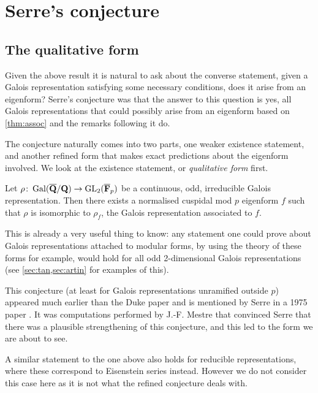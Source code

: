 \documentclass[a4paper,12pt]{article}
\begin{document}
\section{Serre's conjecture}
\subsection{The qualitative form}
Given the above result it is natural to ask about the converse statement, given a Galois representation satisfying some necessary conditions, does it arise from an eigenform?
Serre's conjecture was that the answer to this question is yes, all Galois representations that could possibly arise from an eigenform based on \cref{thm:assoc} and the remarks following it do.

The conjecture naturally comes into two parts, one weaker existence statement, and another refined form that makes exact predictions about the eigenform involved.
We look at the existence statement, or \emph{qualitative form} first.

\begin{conjecture}\label{conj:qual}
Let $\rho\colon \operatorname{Gal}(\overline{\mathbf{Q}}/\mathbf{Q}) \to \operatorname{GL}_2(\overline{\mathbf{F}}_p)$ be a continuous, odd, irreducible Galois representation.
Then there exists a normalised cuspidal mod $p$ eigenform $f$ such that $\rho$ is isomorphic to $\rho_f$, the Galois representation associated to $f$.
\end{conjecture}

This is already a very useful thing to know: any statement one could prove about Galois representations attached to  modular forms, by using the theory of these forms for example, would hold for all odd 2-dimensional Galois representations (see \cref{sec:tan,sec:artin} for examples of this). %

This conjecture (at least for Galois representations unramified outside $p$) appeared much earlier than the Duke paper and is mentioned by Serre in a 1975 paper \cite[sec. 3]{Serre75}.
It was computations performed by J.-F. Mestre that convinced Serre that there was a plausible strengthening of this conjecture, and this led to the form we are about to see.

A similar statement to the one above also holds for reducible representations, where these correspond to Eisenstein series instead.
However we do not consider this case here as it is not what the refined conjecture deals with. %
\end{document}
